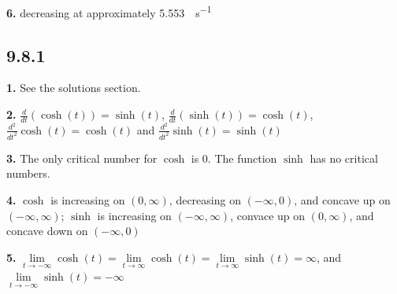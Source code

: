 \documentclass[12pt,]{book}
\theoremstyle{plain}
\theoremstyle{definition}
\numberwithin{equation}{section}
\newcommand{\fe}[2]{#1\mathopen{}\left(#2\right)\mathclose{}}
\newcommand{\ointerval}[2]{\left(#1,#2\right)}
\newcommand{\lzoo}[2]{{\frac{d}{d#1}}{\left(#2\right)}}
\newcommand{\lzon}[2]{\frac{d^{#1}}{d#2^{#1}}}
\begin{document}
            \par\smallskip
\noindent\textbf{6.}\quad{}
                decreasing at approximately \SI{5.553}{\inch\per\second}%

            \par\smallskip
\subsection*{9.8.1 }
\noindent\textbf{1.}\quad{}
                    See the solutions section.%

                \par\smallskip
\noindent\textbf{2.}\quad{}
                    \(\lzoo{t}{\fe{\cosh}{t}}=\fe{\sinh}{t}\), \(\lzoo{t}{\fe{\sinh}{t}}=\fe{\cosh}{t}\), \(\lzon{2}{t}{\fe{\cosh}{t}}=\fe{\cosh}{t}\) and \(\lzon{2}{t}{\fe{\sinh}{t}}=\fe{\sinh}{t}\)%

                \par\smallskip
\noindent\textbf{3.}\quad{}
                    The only critical number for \(\cosh\) is \(0\). The function \(\sinh\) has no critical numbers.%

                \par\smallskip
\noindent\textbf{4.}\quad{}
                    \(\cosh\) is increasing on \(\ointerval{0}{\infty}\), decreasing on \(\ointerval{-\infty}{0}\), and concave up on \(\ointerval{-\infty}{\infty}\); \(\sinh\) is increasing on \(\ointerval{-\infty}{\infty}\), convace up on \(\ointerval{0}{\infty}\), and concave down on \(\ointerval{-\infty}{0}\)%

                \par\smallskip
\noindent\textbf{5.}\quad{}
                    \(\lim\limits_{t\to-\infty}\fe{\cosh}{t}=\lim\limits_{t\to\infty}\fe{\cosh}{t}=\lim\limits_{t\to\infty}\fe{\sinh}{t}=\infty\), and \(\lim\limits_{t\to-\infty}\fe{\sinh}{t}=-\infty\)%
\end{document}
